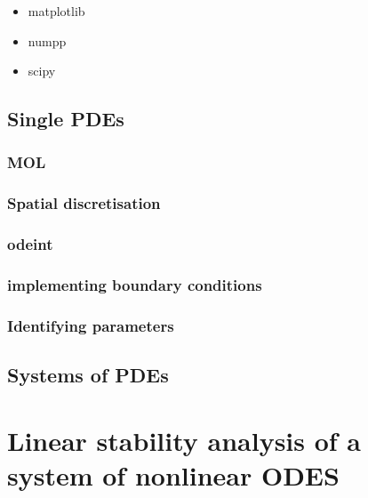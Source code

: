 \documentclass[
  letterpaper,
  DIV=11,
  numbers=noendperiod]{scrreprt}
\providecommand{\tightlist}{%
  \setlength{\itemsep}{0pt}\setlength{\parskip}{0pt}}\usepackage{longtable,booktabs,array}
\theoremstyle{definition}
\theoremstyle{plain}
\theoremstyle{plain}
\theoremstyle{remark}
\begin{document}
\begin{itemize}
\tightlist
\item
  matplotlib
\item
  numpp
\item
  scipy
\end{itemize}

\hypertarget{single-pdes}{%
\section{Single PDEs}\label{single-pdes}}

\hypertarget{mol}{%
\subsection{MOL}\label{mol}}

\hypertarget{spatial-discretisation}{%
\subsection{Spatial discretisation}\label{spatial-discretisation}}

\hypertarget{odeint}{%
\subsection{odeint}\label{odeint}}

\hypertarget{implementing-boundary-conditions}{%
\subsection{implementing boundary
conditions}\label{implementing-boundary-conditions}}

\hypertarget{identifying-parameters}{%
\subsection{Identifying parameters}\label{identifying-parameters}}

\hypertarget{systems-of-pdes}{%
\section{Systems of PDEs}\label{systems-of-pdes}}

\hypertarget{linear-stability-analysis-of-a-system-of-nonlinear-odes}{%
\chapter{Linear stability analysis of a system of nonlinear
ODES}\label{linear-stability-analysis-of-a-system-of-nonlinear-odes}}
\end{document}
